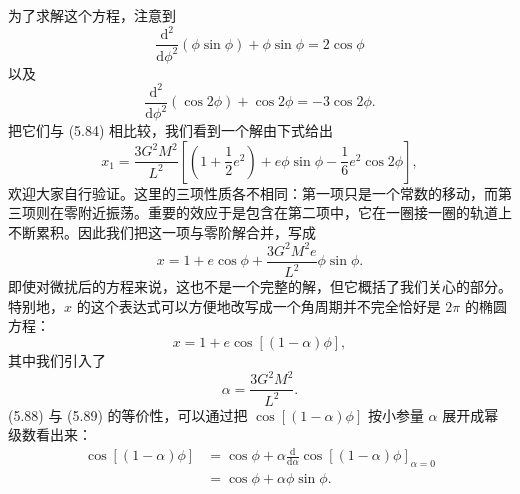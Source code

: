 为了求解这个方程，注意到
\begin{equation*}
\frac{\mathrm{d}^2}{\mathrm{d}\phi^2}(\phi\sin\phi) + \phi\sin\phi = 2\cos\phi
\tag{5.85}
\end{equation*}
以及
\begin{equation*}
\frac{\mathrm{d}^2}{\mathrm{d}\phi^2}(\cos 2\phi) + \cos 2\phi = -3\cos 2\phi.
\tag{5.86}
\end{equation*}
把它们与 (5.84) 相比较，我们看到一个解由下式给出
\begin{equation*}
x_1 = \frac{3G^2M^2}{L^2}\left[\left(1+\frac{1}{2}e^2\right) + e\phi\sin\phi - \frac{1}{6}e^2\cos 2\phi\right],
\tag{5.87}
\end{equation*}
欢迎大家自行验证。这里的三项性质各不相同：第一项只是一个常数的移动，而第三项则在零附近振荡。重要的效应于是包含在第二项中，它在一圈接一圈的轨道上不断累积。因此我们把这一项与零阶解合并，写成
\begin{equation*}
x = 1 + e\cos\phi + \frac{3G^2M^2e}{L^2}\phi\sin\phi.
\tag{5.88}
\end{equation*}
即使对微扰后的方程来说，这也不是一个完整的解，但它概括了我们关心的部分。特别地，$x$ 的这个表达式可以方便地改写成一个角周期并不完全恰好是 $2\pi$ 的椭圆方程：
\begin{equation*}
x = 1 + e\cos[(1-\alpha)\phi],
\tag{5.89}
\end{equation*}
其中我们引入了
\begin{equation*}
\alpha = \frac{3G^2M^2}{L^2}.
\tag{5.90}
\end{equation*}
(5.88) 与 (5.89) 的等价性，可以通过把 $\cos[(1-\alpha)\phi]$ 按小参量 $\alpha$ 展开成幂级数看出来：
\begin{align*}
\cos[(1-\alpha)\phi] &= \cos\phi + \alpha\frac{\mathrm{d}}{\mathrm{d}\alpha}\cos[(1-\alpha)\phi]_{\alpha=0}\\
&= \cos\phi + \alpha\phi\sin\phi.
\tag{5.91}
\end{align*}

